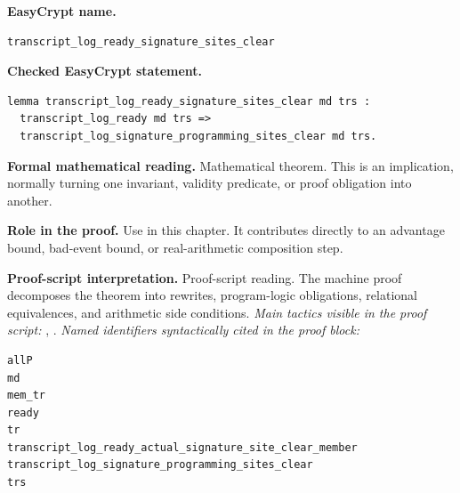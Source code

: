 \begin{formaltheorem}
\noindent\textbf{EasyCrypt name.}
\begin{lstlisting}[language=EasyCrypt,basicstyle=\ttfamily\scriptsize]
transcript_log_ready_signature_sites_clear
\end{lstlisting}
\noindent\textbf{Checked EasyCrypt statement.}
\begin{lstlisting}[language=EasyCrypt,basicstyle=\ttfamily\scriptsize]
lemma transcript_log_ready_signature_sites_clear md trs :
  transcript_log_ready md trs =>
  transcript_log_signature_programming_sites_clear md trs.
\end{lstlisting}
\noindent\textbf{Formal mathematical reading.}
Mathematical theorem. This is an implication, normally turning one invariant, validity predicate, or proof obligation into another.

\noindent\textbf{Role in the proof.}
Use in this chapter. It contributes directly to an advantage bound, bad-event bound, or real-arithmetic composition step.

\noindent\textbf{Proof-script interpretation.}
Proof-script reading. The machine proof decomposes the theorem into rewrites, program-logic obligations, relational equivalences, and arithmetic side conditions.
\emph{Main tactics visible in the proof script:} , .
\emph{Named identifiers syntactically cited in the proof block:}
\begin{lstlisting}[language=EasyCrypt,basicstyle=\ttfamily\scriptsize]
allP
md
mem_tr
ready
tr
transcript_log_ready_actual_signature_site_clear_member
transcript_log_signature_programming_sites_clear
trs
\end{lstlisting}

\end{formaltheorem}

